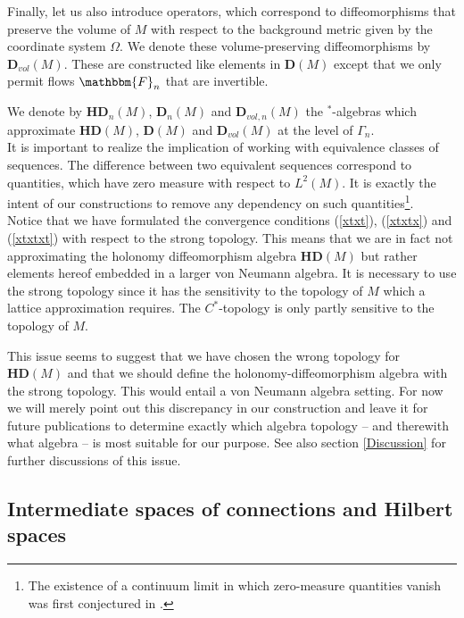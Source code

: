 \documentclass[12pt]{article}
\def\G{\Gamma}
\def\OO{\Omega}
\begin{document}
Finally, let us also introduce operators, which correspond to diffeomorphisms that preserve the volume of $M$ with respect to the background metric given by the coordinate system $\OO$. We denote these volume-preserving diffeomorphisms by $ \mathbf{D}_{vol}(M) $. These are constructed like elements in $ \mathbf{D}(M) $ except that we only permit flows $\mathbbm{F}_n$ that are invertible.


We denote by $\mathbf{HD}_n(M) $, $\mathbf{D}_n(M) $ and $\mathbf{D}_{vol,n}(M) $ the $^*$-algebras which approximate $\mathbf{HD}(M) $, $\mathbf{D}(M) $ and $\mathbf{D}_{vol}(M) $ at the level of $\G_n$.\\


It is important to realize the implication of working with equivalence classes of sequences.  The difference between two equivalent sequences correspond to quantities, which have zero measure with respect to $L^2(M)$. It is exactly the intent of our constructions to remove any dependency on such quantities\footnote{The existence of a continuum limit in which zero-measure quantities vanish was first conjectured in \cite{Aastrup:2009ra}.}. \\


Notice that we have formulated the convergence conditions (\ref{xtxt}),  (\ref{xtxtx}) and  (\ref{xtxtxt}) with respect to the strong topology. This means that we are in fact not approximating the holonomy diffeomorphism algebra $\mathbf{HD}(M) $ but rather elements hereof embedded in a larger von Neumann algebra. It is necessary to use the strong topology since it has the sensitivity to the topology of $M$ which a lattice approximation requires. The $C^*$-topology is only partly sensitive to the topology of $M$.

This issue seems to suggest that we have chosen the wrong topology for $\mathbf{HD}(M) $ and that we should define the holonomy-diffeomorphism algebra with the strong topology. This would entail a von Neumann algebra setting. For now we will merely point out this discrepancy in our construction and leave it for future publications to determine exactly which algebra topology -- and therewith what algebra --  is most suitable for our purpose. See also section \ref{Discussion} for further discussions of this issue.




\subsection{Intermediate spaces of connections and Hilbert spaces}
\end{document}
